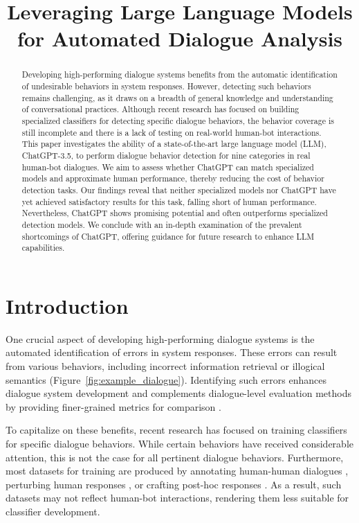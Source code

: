\title{Leveraging Large Language Models for Automated Dialogue Analysis}

\begin{abstract}
Developing high-performing dialogue systems benefits from the automatic identification of undesirable behaviors in system responses. However, detecting such behaviors remains challenging, as it draws on a breadth of general knowledge and understanding of conversational practices. Although recent research has focused on building specialized classifiers for detecting specific dialogue behaviors, the behavior coverage is still incomplete and there is a lack of testing on real-world human-bot interactions. This paper investigates the ability of a state-of-the-art large language model (LLM), \linebreak ChatGPT-3.5, to perform dialogue behavior detection for nine categories in real human-bot dialogues. We aim to assess whether ChatGPT can match specialized models and approximate human performance, thereby reducing the cost of behavior detection tasks. Our findings reveal that neither specialized models nor ChatGPT have yet achieved satisfactory results for this task, falling short of human performance. Nevertheless, ChatGPT shows promising potential and often outperforms specialized detection models. We conclude with an in-depth examination of the prevalent shortcomings of ChatGPT, offering guidance for future research to enhance LLM capabilities.
\end{abstract}

\section{Introduction}

One crucial aspect of developing high-performing dialogue systems is the automated identification of errors in system responses. These errors can result from various behaviors, including incorrect information retrieval or illogical semantics (Figure~\ref{fig:example_dialogue}).
Identifying such errors enhances dialogue system development and complements dialogue-level evaluation methods by providing finer-grained metrics for comparison \cite{finch:23}.

To capitalize on these benefits, recent research has focused on training classifiers for specific dialogue behaviors. While certain behaviors have received considerable attention, this is not the case for all pertinent dialogue behaviors. Furthermore, most datasets for training are produced by annotating human-human dialogues \cite{sharma:20}, perturbing human responses \cite{gupta:22}, or crafting post-hoc responses \cite{nie:21}. As a result, such datasets may not reflect human-bot interactions, rendering them less suitable for classifier development.

